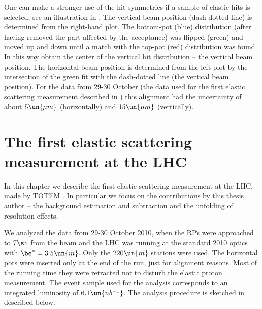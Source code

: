 One can make a stronger use of the hit symmetries if a sample of elastic hits is selected, see an illustration in . The vertical beam position (dash-dotted line) is determined from the right-hand plot. The bottom-pot (blue) distribution (after having removed the part affected by the acceptance) was flipped (green) and moved up and down until a match with the top-pot (red) distribution was found. In this way obtain the center of the vertical hit distribution -- the vertical beam position. The horizontal beam position is determined from the left plot by the intersection of the green fit with the dash-dotted line (the vertical beam position). For the data from 29-30 October (the data used for the first elastic scattering measurement described in ) this alignment had the uncertainty of about $5\un{\mu m}$ (horizontally) and $15\un{\mu m}$ (vertically).

\kern-5mm

\chapter[felm]{The first elastic scattering measurement at the LHC}

In this chapter we describe the first elastic scattering measurement at the LHC, made by TOTEM . In particular we focus on the contributions by this thesis author -- the background estimation and subtraction and the unfolding of resolution effects.

\kern-5mm

We analyzed the data from 29-30 October 2010, when the RPs were approached to $7\si$ from the beam and the LHC was running at the standard 2010 optics with $\be^* = 3.5\un{m}$. Only the $220\un{m}$ stations were used. The horizontal pots were inserted only at the end of the run, just for alignment reasons. Most of the running time they were retracted not to disturb the elastic proton measurement. The event sample used for the analysis corresponds to an integrated luminosity of $6.1\un{nb^{-1}}$. The analysis procedure is sketched in  described below.

